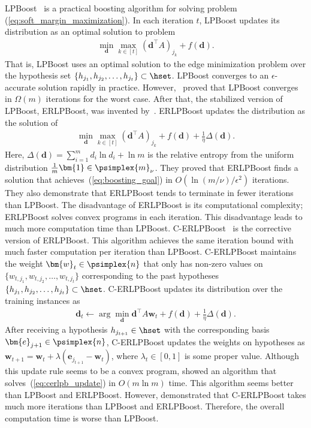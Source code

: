 LPBoost~\citep{demiriz+:ml02} is a practical boosting algorithm 
for solving problem (\ref{eq:soft_margin_maximization}). 
In each iteration $t$, LPBoost updates its distribution as 
an optimal solution to problem 
\begin{align}
    \label{eq:lpb_update}
    \min_{\bm{d}}
        \max_{k \in [t]} (\bm{d}^\top A)_{j_k}
        + f(\bm d).
\end{align}
That is, LPBoost uses an optimal solution to 
the edge minimization problem over the hypothesis set 
$\{h_{j_1}, h_{j_2}, \dots, h_{j_t}\} \subset \hset$. 
LPBoost converges to an $\epsilon$-accurate solution rapidly in practice. 
However,~\cite{warmuth+:nips07} proved that LPBoost converges 
in $\Omega(m)$ iterations for the worst case. 
After that, the stabilized version of LPBoost, 
ERLPBoost, was invented by~\cite{warmuth+:alt08}. 
ERLPBoost updates the distribution as the solution of 
\begin{align}
    \label{eq:erlpb_update}
    \min_{\bm{d}}
        \max_{k \in [t]} (\bm{d}^\top A)_{j_k}
        + f(\bm d)
        + \frac 1 \eta \Delta(\bm{d}).
\end{align}
Here, $\Delta(\bm{d}) = \sum_{i=1}^m d_i \ln d_i + \ln m$ is 
the relative entropy 
from the uniform distribution $\frac 1 m \bm{1} \in \psimplex{m}_{\nu}$. 
They proved that ERLPBoost finds a solution 
that achieves~(\ref{eq:boosting_goal}) in 
$O(\ln (m/\nu) / \epsilon^2)$ iterations. 
They also demonstrate that ERLPBoost tends to terminate 
in fewer iterations than LPBoost. 
The disadvantage of ERLPBoost is its computational complexity; 
ERLPBoost solves convex programs in each iteration. 
This disadvantage leads to much more computation time than LPBoost. 
C-ERLPBoost~\citep{shalev-shwartz+:jml10} 
is the corrective version of ERLPBoost. 
This algorithm achieves the same iteration bound 
with much faster computation per iteration than LPBoost. 
C-ERLPBoost maintains 
the weight $\bm{w}_t \in \psimplex{n}$ that only has non-zero values on
$\{ w_{t, j_1}, w_{t, j_2}, \dots, w_{t, j_t}\}$ 
corresponding to the past hypotheses 
$\{h_{j_1}, h_{j_2}, \dots, h_{j_t}\} \subset \hset$.
C-ERLPBoost updates its distribution over the training instances as 
\begin{align}
    \label{eq:cerlpb_update}
    \bm{d}_t \gets
    \arg \min_{\bm{d}}
    \bm{d}^\top A \bm{w}_t + f(\bm{d}) + \frac 1 \eta \Delta(\bm d). 
\end{align}
After receiving a hypothesis $h_{j_{t+1}} \in \hset$ 
with the corresponding basis $\bm{e}_{j+1} \in \psimplex{n}$, 
C-ERLPBoost updates the weights on hypotheses as 
$\bm{w}_{t+1} = \bm{w}_t + \lambda (\bm{e}_{j_{t+1}} - \bm{w}_t)$, 
where $\lambda_t \in [0, 1]$ is some proper value. 
Although this update rule seems to be a convex program, 
\cite{shalev-shwartz+:jml10} showed an algorithm 
that solves~(\ref{eq:cerlpb_update}) in $O(m \ln m)$ time. 
This algorithm seems better than LPBoost and ERLPBoost. 
However, \cite{warmuth+:alt08} demonstrated that C-ERLPBoost takes 
much more iterations than LPBoost and ERLPBoost. 
Therefore, the overall computation time is worse than LPBoost. 


